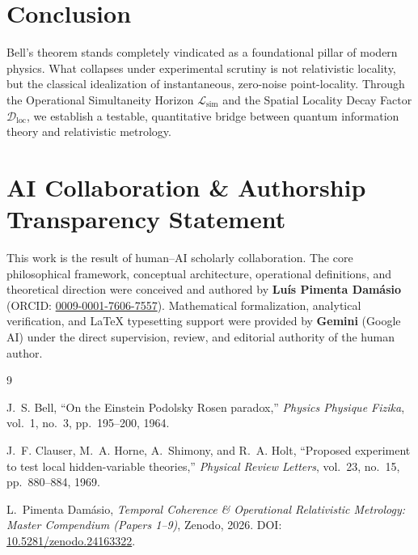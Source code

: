 \documentclass[11pt,a4paper]{article}
\begin{document}
\section{Conclusion}

Bell's theorem stands completely vindicated as a foundational pillar of modern physics. What collapses under experimental scrutiny is not relativistic locality, but the classical idealization of instantaneous, zero-noise point-locality. Through the Operational Simultaneity Horizon $\mathcal{L}_{\mathrm{sim}}$ and the Spatial Locality Decay Factor $\mathcal{D}_{\mathrm{loc}}$, we establish a testable, quantitative bridge between quantum information theory and relativistic metrology.

\section*{AI Collaboration \& Authorship Transparency Statement}

This work is the result of human--AI scholarly collaboration. The core philosophical framework, conceptual architecture, operational definitions, and theoretical direction were conceived and authored by \textbf{Lu\'{i}s Pimenta Dam\'{a}sio} (ORCID: \href{https://orcid.org/0009-0001-7606-7557}{0009-0001-7606-7557}). Mathematical formalization, analytical verification, and LaTeX typesetting support were provided by \textbf{Gemini} (Google AI) under the direct supervision, review, and editorial authority of the human author.

\begin{thebibliography}{9}

J.~S. Bell, ``On the Einstein Podolsky Rosen paradox,'' \emph{Physics Physique Fizika}, vol.~1, no.~3, pp.~195--200, 1964.

J.~F. Clauser, M.~A. Horne, A.~Shimony, and R.~A. Holt, ``Proposed experiment to test local hidden-variable theories,'' \emph{Physical Review Letters}, vol.~23, no.~15, pp.~880--884, 1969.

L.~{Pimenta Dam\'{a}sio}, \emph{Temporal Coherence \& Operational Relativistic Metrology: Master Compendium (Papers 1--9)}, Zenodo, 2026. DOI: \href{https://doi.org/10.5281/zenodo.24163322}{10.5281/zenodo.24163322}.

\end{thebibliography}
\end{document}
